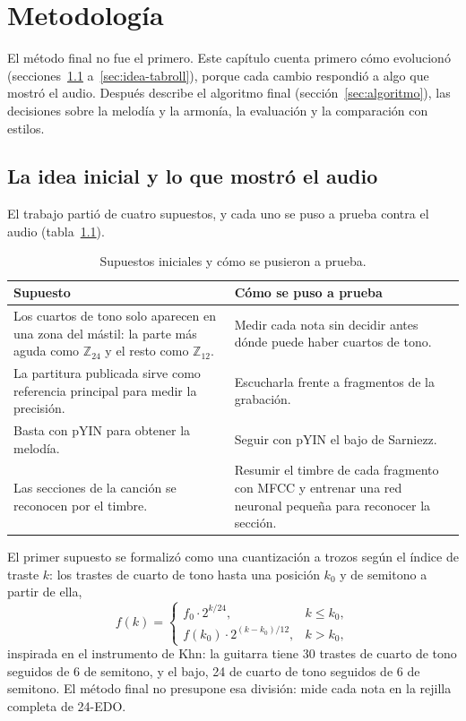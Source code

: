 \chapter{Metodología}\label{cap:metodologia}

El método final no fue el primero. Este capítulo cuenta primero cómo evolucionó (secciones~\ref{sec:idea-inicial}
a~\ref{sec:idea-tabroll}), porque cada cambio respondió a algo que mostró el audio. Después describe el algoritmo final
(sección~\ref{sec:algoritmo}), las decisiones sobre la melodía y la armonía, la evaluación y la comparación con estilos.

\section{La idea inicial y lo que mostró el audio}\label{sec:idea-inicial}

El trabajo partió de cuatro supuestos, y cada uno se puso a prueba contra el audio
(tabla~\ref{tab:supuestos}).

\begin{table}[ht]
  \centering\small
  \caption{Supuestos iniciales y cómo se pusieron a prueba.}\label{tab:supuestos}
  \begin{tabularx}{\textwidth}{@{}>{\raggedright}X>{\raggedright\arraybackslash}X@{}}
    \toprule
    Supuesto & Cómo se puso a prueba \\
    \midrule
    Los cuartos de tono solo aparecen en una zona del mástil: la parte más aguda como $\mathbb{Z}_{24}$ y el resto como
    $\mathbb{Z}_{12}$. & Medir cada nota sin decidir antes dónde puede haber cuartos de tono. \\
    La partitura publicada sirve como referencia principal para medir la precisión. & Escucharla frente a fragmentos de
    la grabación. \\
    Basta con pYIN para obtener la melodía. & Seguir con pYIN el bajo de Sarniezz. \\
    Las secciones de la canción se reconocen por el timbre. & Resumir el timbre de cada fragmento con MFCC y entrenar una
    red neuronal pequeña para reconocer la sección. \\
    \bottomrule
  \end{tabularx}
\end{table}

El primer supuesto se formalizó como una cuantización a trozos según el índice de traste $k$: los trastes de cuarto de
tono hasta una posición $k_0$ y de semitono a partir de ella,
\[
  f(k) =
  \begin{cases}
    f_0 \cdot 2^{k/24}, & k \le k_0, \\
    f(k_0) \cdot 2^{(k - k_0)/12}, & k > k_0,
  \end{cases}
\]
inspirada en el instrumento de Khn: la guitarra tiene 30 trastes de cuarto de tono seguidos de 6 de semitono, y el bajo,
24 de cuarto de tono seguidos de 6 de semitono.  El método final no presupone
esa división: mide cada nota en la rejilla completa de 24-EDO.

